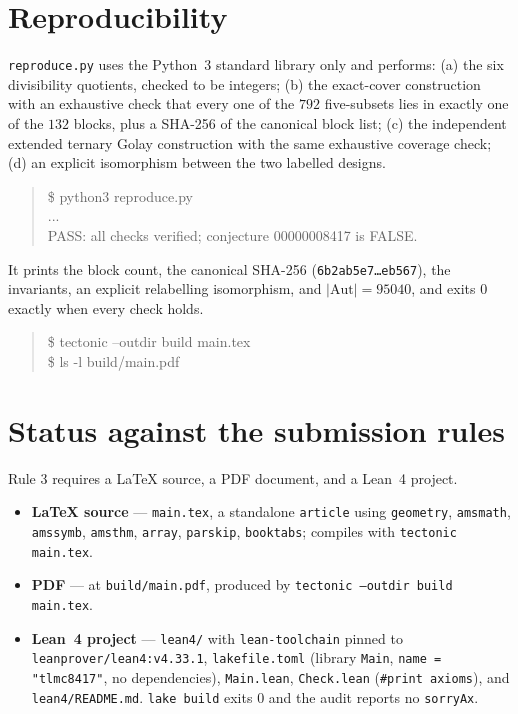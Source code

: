 \documentclass[11pt]{article}
\theoremstyle{definition}
\theoremstyle{remark}
\begin{document}
\section{Reproducibility}

\texttt{reproduce.py} uses the Python~3 standard library only and performs:
(a) the six divisibility quotients, checked to be integers;
(b) the exact-cover construction with an exhaustive check that every one of the
$792$ five-subsets lies in exactly one of the $132$ blocks, plus a SHA-256 of
the canonical block list;
(c) the independent extended ternary Golay construction with the same
exhaustive coverage check;
(d) an explicit isomorphism between the two labelled designs.

\begin{quote}\ttfamily
\$ python3 reproduce.py\\
...\\
PASS: all checks verified; conjecture 00000008417 is FALSE.
\end{quote}

It prints the block count, the canonical SHA-256
(\texttt{6b2ab5e7\dots eb567}), the invariants, an explicit relabelling
isomorphism, and $|\mathrm{Aut}| = 95040$, and exits $0$ exactly when every
check holds.

\begin{quote}\ttfamily
\$ tectonic --outdir build main.tex\\
\$ ls -l build/main.pdf
\end{quote}

\section*{Status against the submission rules}

Rule 3 requires a LaTeX source, a PDF document, and a Lean~4 project.

\begin{itemize}
\item \textbf{LaTeX source} --- \texttt{main.tex}, a standalone \texttt{article}
  using \texttt{geometry}, \texttt{amsmath}, \texttt{amssymb}, \texttt{amsthm},
  \texttt{array}, \texttt{parskip}, \texttt{booktabs}; compiles with
  \texttt{tectonic main.tex}.
\item \textbf{PDF} --- at \texttt{build/main.pdf}, produced by
  \texttt{tectonic --outdir build main.tex}.
\item \textbf{Lean~4 project} --- \texttt{lean4/} with \texttt{lean-toolchain}
  pinned to \texttt{leanprover/lean4:v4.33.1}, \texttt{lakefile.toml}
  (library \texttt{Main}, \texttt{name = "tlmc8417"}, no dependencies),
  \texttt{Main.lean}, \texttt{Check.lean} (\texttt{\#print axioms}), and
  \texttt{lean4/README.md}. \texttt{lake build} exits $0$ and the audit reports
  no \texttt{sorryAx}.
\end{itemize}
\end{document}
